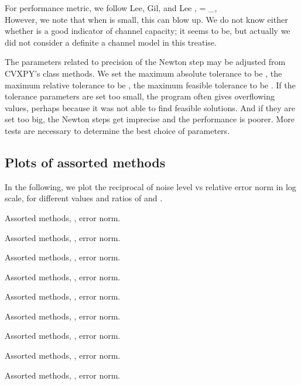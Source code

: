 For performance metric, we follow Lee, Gil, and Lee \cite {LGL16},
 {
\tilde {\chi}
= _{}, \\
}
However, we note that when  is small, this can blow up.
We do not know either whether \m {\tilde {\chi}} is a good indicator of channel capacity; it seems to be, but actually we did not consider a definite a channel model in this treatise.

The parameters related to precision of the Newton step may be adjusted from CVXPY's class methods.
We set the maximum absolute tolerance to be ,
the maximum relative tolerance to be ,
the maximum feasible tolerance to be .
If the tolerance parameters are set too small, the program often gives overflowing values, perhaps because it was not able to find feasible solutions.
And if they are set too big, the Newton steps get imprecise and the performance is poorer.
More tests are necessary to determine the best choice of parameters.



\subsection {Plots of assorted methods}

In the following, we plot the reciprocal of noise level vs relative error norm in log scale, for different values and ratios of  and .

\blank [big]
\caption {Assorted methods, , error norm.}
\blank [big]
%
\blank [big]
\caption {Assorted methods, , error norm.}
\blank [big]
%
\blank [big]
\caption {Assorted methods, , error norm.}
\blank [big]
%
\blank [big]
\caption {Assorted methods, , error norm.}
\blank [big]
%
\blank [big]
\caption {Assorted methods, , error norm.}
\blank [big]
%
\blank [big]
\caption {Assorted methods, , error norm.}
%
\blank [big]
\caption {Assorted methods, , error norm.}
%
\blank [big]
\caption {Assorted methods, , error norm.}
%
\blank [big]
\caption {Assorted methods, , error norm.}

